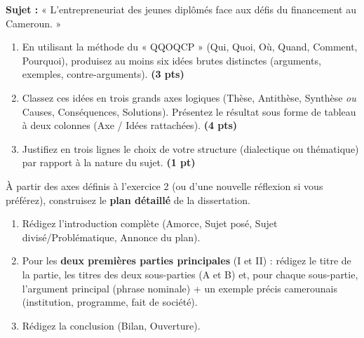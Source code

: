 \documentclass[11pt]{article}
\begin{document}
\begin{exercice}
\textbf{Sujet :} « L'entrepreneuriat des jeunes diplômés face aux défis du financement au Cameroun. »

\begin{enumerate}
    \item En utilisant la méthode du « QQOQCP » (Qui, Quoi, Où, Quand, Comment, Pourquoi), produisez au moins six idées brutes distinctes (arguments, exemples, contre-arguments). \hfill\textbf{(3 pts)}
    \item Classez ces idées en trois grands axes logiques (Thèse, Antithèse, Synthèse \textit{ou} Causes, Conséquences, Solutions). Présentez le résultat sous forme de tableau à deux colonnes (Axe / Idées rattachées). \hfill\textbf{(4 pts)}
    \item Justifiez en trois lignes le choix de votre structure (dialectique ou thématique) par rapport à la nature du sujet. \hfill\textbf{(1 pt)}
\end{enumerate}
\end{exercice}

\begin{exercice}
À partir des axes définis à l'exercice 2 (ou d'une nouvelle réflexion si vous préférez), construisez le \textbf{plan détaillé} de la dissertation.

\providecommand{\pts}[1]{\hfill\normalfont{(#1)}}
\begin{enumerate}
    \item Rédigez l'introduction complète (Amorce, Sujet posé, Sujet divisé/Problématique, Annonce du plan). \pts{3 pts}
    \item Pour les \textbf{deux premières parties principales} (I et II) : rédigez le titre de la partie, les titres des deux sous-parties (A et B) et, pour chaque sous-partie, l'argument principal (phrase nominale) + un exemple précis camerounais (institution, programme, fait de société). \pts{5 pts}
    \item Rédigez la conclusion (Bilan, Ouverture). \pts{2 pts}
\end{enumerate}
\end{exercice}

\providecommand{\gras}[1]{\textbf{#1}}
\providecommand{\ital}[1]{\textit{#1}}
\providecommand{\pts}[1]{\hfill\textit{(#1)}}
\providecommand{\exercice}[1][]{\par\medskip\noindent\textbf{Exercice\ifstrempty{#1}{}{~:#1}}\par\medskip}
\end{document}
